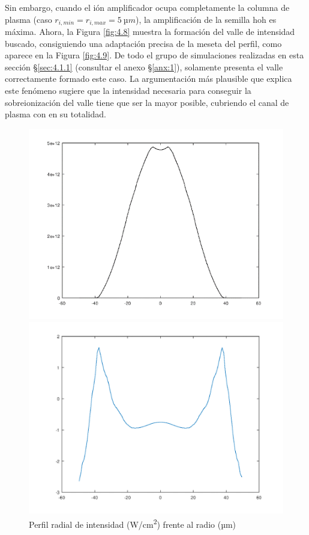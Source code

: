 Sin embargo, cuando el ión amplificador ocupa completamente la columna de plasma (caso $r_{i,min}=r_{i,max}=\qty{5}{µm}$), la amplificación de la semilla \acrshort{hoh} es máxima. Ahora, la Figura \ref{fig:4.8} muestra la formación del valle de intensidad buscado, consiguiendo una adaptación precisa de la meseta del perfil, como aparece en la Figura \ref{fig:4.9}. De todo el grupo de simulaciones realizadas en esta sección \S\ref{sec:4.1.1} (consultar el anexo \S\ref{anx:1}), solamente presenta el valle correctamente formado este caso. La argumentación más plausible que explica este fenómeno sugiere que la intensidad necesaria para conseguir la sobreionización del valle tiene que ser la mayor posible, cubriendo el canal de plasma con  en su totalidad.

\begin{figure}[htbp]
  \centering
  \begin{subcaptionblock}{.4\textwidth}
    \centering
    \includegraphics[width=\textwidth]{Figuras/ch4_int05.png}
    \caption{Perfil radial de intensidad (\unit{W/cm^2}) frente al radio (\unit{µm})}\label{fig:ch4_int05}
  \end{subcaptionblock}
  \begin{subcaptionblock}{.4\textwidth}
    \centering
    \includegraphics[width=\textwidth]{Figuras/ch4_fs05.png}

\end{subcaptionblock}
\end{figure}
